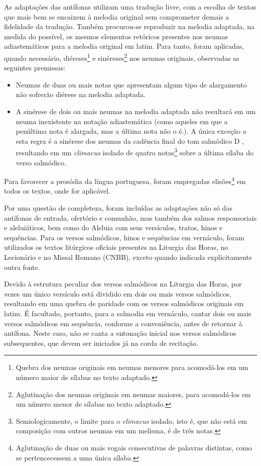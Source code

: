 As adaptações das antífonas utilizam uma tradução livre, com a escolha de textos que mais bem se encaixem à melodia original sem comprometer demais a fidelidade da tradução. Também procurou-se reproduzir na melodia adaptada, na medida do possível, os mesmos elementos retóricos presentes nos neumas adiastemáticos para a melodia original em latim. Para tanto, foram aplicadas, quando necessário, diéreses\footnote{Quebra dos neumas originais em neumas menores para acomodá-los em um número maior de sílabas no texto adaptado.} e sinéreses\footnote{Aglutinação dos neumas originais em neumas maiores, para acomodá-los em um número menor de sílabas no texto adaptado.} nos neumas originais, observadas as seguintes premissas:
\begin{itemize}
  \item Neumas de duas ou mais notas que apresentam algum tipo de alargamento não sofrerão diérese na melodia adaptada.
  \item A sinérese de dois ou mais neumas na melodia adaptada não resultará em um neuma inexistente na notação adiastemática (como aqueles em que a penúltima nota é alargada, mas a última nota não o é.). A única exceção a esta regra é a sinérese dos neumas da cadência final do tom salmódico D \GreStar, resultando em um \emph{climacus} isolado de quatro notas\footnote{Semiologicamente, o limite para o \emph{climacus} isolado, isto é, que não está em composição com outros neumas em um melisma, é de três notas.} sobre a última sílaba do verso salmódico.
\end{itemize}

Para favorecer a prosódia da língua portuguesa, foram empregadas elisões\footnote{Aglutinação de duas ou mais vogais consecutivas de palavras distintas, como se pertencecessem a uma única sílaba.} em todos os textos, onde for aplicável.

Por uma questão de completeza, foram incluídas as adaptações não só das antífonas de entrada, ofertório e comunhão, mas também dos salmos responsoriais e aleluiáticos, bem como do Aleluia com seus versículos, tratos, hinos e sequências. Para os versos salmódicos, hinos e sequências em vernáculo, foram utilizados os textos litúrgicos oficiais presentes na Liturgia das Horas, no Lecionário e no Missal Romano (CNBB), exceto quando indicada explicitamente outra fonte.

Devido à estrutura peculiar dos versos salmódicos na Liturgia das Horas, por vezes um único versículo está dividido em dois ou mais versos salmódicos, resultando em uma quebra de paridade com os versos salmódicos originais em latim. É facultado, portanto, para a salmodia em vernáculo, cantar dois ou mais versos salmódicos em sequência, conforme a conveniência, antes de retornar à antífona. Neste caso, não se canta a entonação inicial nos versos salmódicos subsequentes, que devem ser iniciados já na corda de recitação.

